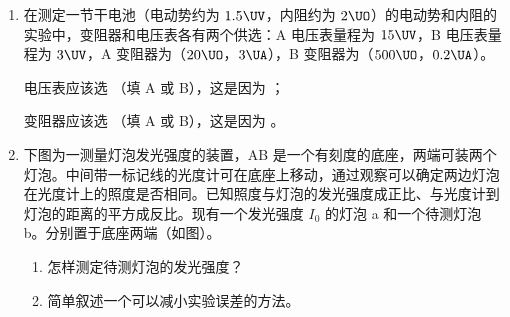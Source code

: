 \documentclass[\gkver]{gaokaozhenti}
\begin{document}
\begin{enumerate}


\item
在测定一节干电池（电动势约为 $1.5\UV$，内阻约为 $2\UO$）的电动势和内阻的实验中，变阻器和电压表各有两个供选：A 电压表量程为 $15\UV$，B 电压表量程为 $3\UV$，A 变阻器为（$20\UO$，$3\UA$），B 变阻器为（$500\UO$，$0.2\UA$）。

电压表应该选 （填 A 或 B），这是因为 ；

变阻器应该选 （填 A 或 B），这是因为 。



\item
下图为一测量灯泡发光强度的装置，AB 是一个有刻度的底座，两端可装两个灯泡。中间带一标记线的光度计可在底座上移动，通过观察可以确定两边灯泡在光度计上的照度是否相同。已知照度与灯泡的发光强度成正比、与光度计到灯泡的距离的平方成反比。现有一个发光强度 $I_{0}$ 的灯泡 a 和一个待测灯泡 b。分别置于底座两端（如图）。
\onepicture[w=9.05cm]{}
\begin{enumerate}
	\item
	怎样测定待测灯泡的发光强度？
	\item
	简单叙述一个可以减小实验误差的方法。
\end{enumerate}



\end{enumerate}
\end{document}
